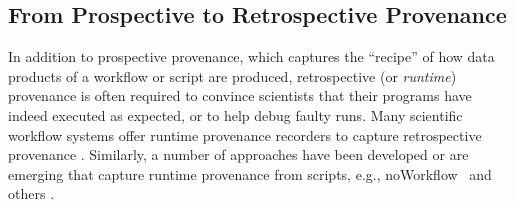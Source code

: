 \documentclass[nocopyrightspace]{sigplanconf}
\newcommand{\NW}{\textsf{noWorkflow}}
\begin{document}
\subsection*{From Prospective to Retrospective Provenance} 
In addition to prospective provenance, which captures the ``recipe''
of how data products of a workflow or script are produced,
retrospective (or \emph{runtime}) provenance is often required to
convince scientists that their programs have indeed executed as
expected, or to help debug faulty runs.  Many scientific workflow
systems offer runtime provenance recorders to capture retrospective
provenance
\cite{altintas2006provenance,davidson2007provenance,bowers2008kepler}. Similarly,
a number of approaches have been developed or are emerging that
capture runtime provenance from scripts, e.g., \NW\
\cite{murta2014nw} and others \cite{gandrud2013reproducible}.
\end{document}

